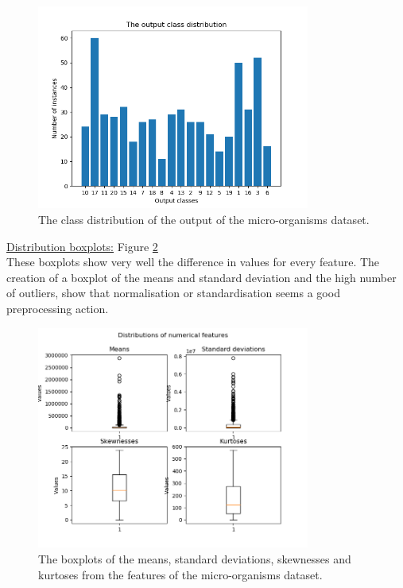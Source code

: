 \documentclass[10pt,a4paper]{report}
\begin{document}
\begin{itemize}
		\begin{figure}[]
			\centering
			\includegraphics[width=0.8\textwidth]{MO_Class.png}
			\caption{The class distribution of the output of the micro-organisms dataset.}
			\label{fig:MOClass}
		\end{figure}
		
		\underline{Distribution boxplots:} Figure \ref{fig:MODist} \\
		
		These boxplots show very well the difference in values for every feature. The creation of a boxplot of the means and standard deviation and the high number of outliers, show that normalisation or standardisation seems a good preprocessing action.
		
		\begin{figure}[]
			\centering
			\includegraphics[width=0.8\textwidth]{MO_Dist.png}
			\caption{The boxplots of the means, standard deviations, skewnesses and kurtoses from the features of the micro-organisms dataset.}
			\label{fig:MODist}
		\end{figure}
		

\end{itemize}
\end{document}
